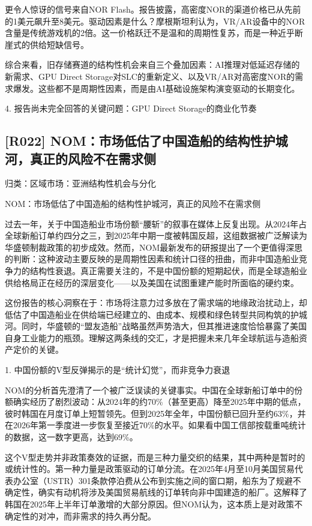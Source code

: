 \documentclass[11pt]{ctexart}
\begin{document}
更令人惊讶的信号来自NOR Flash。报告披露，高密度NOR的渠道价格已从先前的1美元飙升至8美元。驱动因素是什么？摩根斯坦利认为，VR/AR设备中的NOR含量是传统游戏机的2倍。这一价格跃迁不是温和的周期性复苏，而是一种近乎断崖式的供给短缺信号。

综合来看，旧存储赛道的结构性机会来自三个叠加因素：AI推理对低延迟存储的新需求、GPU Direct Storage对SLC的重新定义、以及VR/AR对高密度NOR的需求爆发。这些都不是周期性因素，而是由AI基础设施架构演变驱动的长期变化。

4. 报告尚未完全回答的关键问题：GPU Direct Storage的商业化节奏

\subsection{[R022] NOM：市场低估了中国造船的结构性护城河，真正的风险不在需求侧}
{\small\color{refgray}归类：区域市场：亚洲结构性机会与分化}

NOM：市场低估了中国造船的结构性护城河，真正的风险不在需求侧

过去一年，关于中国造船业市场份额“腰斩”的叙事在媒体上反复出现。从2024年占全球新船订单约四分之三，到2025年中期一度被韩国反超，这组数据被广泛解读为华盛顿制裁政策的初步成效。然而，NOM最新发布的研报提出了一个更值得深思的判断：这种波动主要反映的是周期性因素和统计口径的扭曲，而非中国造船业竞争力的结构性衰退。真正需要关注的，不是中国份额的短期起伏，而是全球造船业供给格局正在经历的深层变化——以及美国在试图重建产能时所面临的硬约束。

这份报告的核心洞察在于：市场将注意力过多放在了需求端的地缘政治扰动上，却低估了中国造船业在供给端已经建立的、由成本、规模和绿色转型共同构筑的护城河。同时，华盛顿的“盟友造船”战略虽然声势浩大，但其推进速度恰恰暴露了美国自身工业能力的瓶颈。理解这两条线的交汇，才是把握未来几年全球航运与造船资产定价的关键。

1. 中国份额的V型反弹揭示的是“统计幻觉”，而非竞争力衰退

NOM的分析首先澄清了一个被广泛误读的关键事实。中国在全球新船订单中的份额确实经历了剧烈波动：从2024年的约70\%（甚至更高）降至2025年中期的低点，彼时韩国在月度订单上短暂领先。但到2025年全年，中国份额已回升至约63\%，并在2026年第一季度进一步恢复至接近70\%的水平。如果看中国工信部按载重吨统计的数据，这一数字更高，达到69\%。

这个V型走势并非政策奏效的证据，而是三种力量交织的结果，其中两种是暂时的或统计性的。第一种力量是政策驱动的订单分流。在2025年4月至10月美国贸易代表办公室（USTR）301条款停泊费从公布到实施之间的窗口期，船东为了规避不确定性，确实有动机将涉及美国贸易航线的订单转向非中国建造的船厂。这解释了韩国在2025年上半年订单激增的大部分原因。但NOM认为，这本质上是对政策不确定性的对冲，而非需求的持久再分配。
\end{document}
